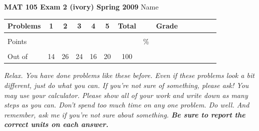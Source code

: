 \documentclass[12pt]{article}
\begin{document}
\textbf{MAT 105 Exam 2 (ivory) Spring 2009} \hspace{.4in} {\large Name} \hrulefill

\begin{center}

\begin{tabular}
{|l|c|c|c|c|c|c|c|c|c|c|c|c|c|} \hline

 Problems & \hspace{5 pt} 1 \hspace{5 pt}  & \hspace{5 pt} 2 \hspace{5 pt} & \hspace{5 pt} 3  \hspace{5 pt} & \hspace{5 pt} 4  \hspace{5 pt} & \hspace{5 pt}5 \hspace{5 pt} & \hspace{5 pt} Total  \hspace{5 pt} & &  \hspace{5 pt} Grade \hspace{5 pt}  \\ \hline
&&&&&&&&\\  
Points &&&&&&&    \hspace{.8in}\% &  \\ 
&&&&&&&& \\  \hline
Out of & 14 & 26 & 24  & 16 & 20 &100 & & \\ \hline

\end {tabular}

\end{center}

\vspace{.2in}

 \emph{Relax.  You have done problems like these before.  Even if these problems look a bit different, just do what you can.  If you're not sure of something, please ask! You may use your calculator.  Please show all of your work and write down as many steps as you can.  Don't spend too much time on any one problem.  Do well.  And remember, ask me if you're not sure about something. \textbf{Be sure to report the correct units on each answer.}}

\hrulefill
\end{document}
